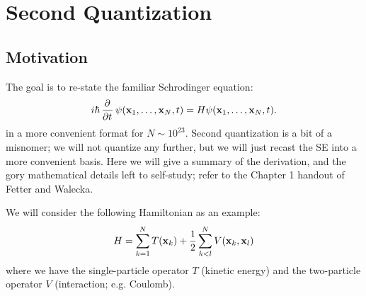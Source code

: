 \section{Second Quantization}
\subsection{Motivation}
The goal is to re-state the familiar Schrodinger equation:
\begin{equation}\label{eq-se}
    i\hbar\dpd{}{t}\psi(\v{x}_1, \ldots, \v{x}_N, t) = H\psi(\v{x}_1, \ldots, \v{x}_N, t).
\end{equation}
in a more convenient format for $N \sim 10^{23}$. Second quantization is a bit of a misnomer; we will not quantize any further, but we will just recast the SE into a more convenient basis. Here we will give a summary of the derivation, and the gory mathematical details left to self-study; refer to the Chapter 1 handout of Fetter and Walecka.

We will consider the following Hamiltonian as an example:
\begin{equation}
    H = \sum_{k=1}^N T(\mathbf{x}_k) + \frac{1}{2}\sum_{k < l}^N V(\mathbf{x}_k, \mathbf{x}_l)
\end{equation}
where we have the single-particle operator $T$ (kinetic energy) and the two-particle operator $V$ (interaction; e.g. Coulomb).

